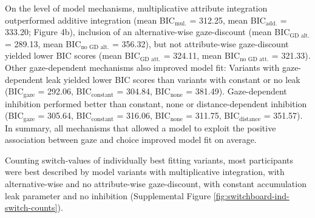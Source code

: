 \documentclass[11pt, a4paper]{article}
\begin{document}
On the level of model mechanisms, multiplicative attribute integration outperformed additive integration (mean BIC$_{\text{mul.}}$ = 312.25, mean BIC$_{\text{add.}}$ = 333.20; Figure 4b), inclusion of an alternative-wise gaze-discount (mean BIC$_{\text{GD alt.}}$ = 289.13, mean BIC$_{\text{no GD alt.}}$  = 356.32), but not attribute-wise gaze-discount yielded lower BIC scores (mean BIC$_{\text{GD att.}}$  = 324.11, mean BIC$_{\text{no GD att.}}$ = 321.33). Other gaze-dependent mechanisms also improved model fit: Variants with gaze-dependent leak yielded lower BIC scores than variants with constant or no leak (BIC$_{\text{gaze}}$  = 292.06, BIC$_{\text{constant}}$ = 304.84, BIC$_{\text{none}}$ = 381.49). Gaze-dependent inhibition performed better than constant, none or distance-dependent inhibition (BIC$_{\text{gaze}}$ = 305.64, BIC$_{\text{constant}}$ = 316.06, BIC$_{\text{none}}$ = 311.75, BIC$_{\text{distance}}$ = 351.57). In summary, all mechanisms that allowed a model to exploit the positive association between gaze and choice improved model fit on average.

Counting switch-values of individually best fitting variants, most participants were best described by model variants with multiplicative integration, with alternative-wise and no attribute-wise gaze-discount, with constant accumulation leak parameter and no inhibition (Supplemental Figure \ref{fig:switchboard-ind-switch-counts}).
\end{document}
